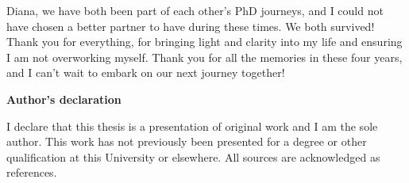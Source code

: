 Diana, we have both been part of each other's PhD journeys, and I could not have chosen a better partner to have during these times. We both survived! Thank you for everything, for bringing light and clarity into my life and ensuring I am not overworking myself. Thank you for all the memories in these four years, and I can't wait to embark on our next journey together!











\newpage 

\thispagestyle{plain}
\begin{center}
    \Large        
    \textbf{Author's declaration}
    \vspace{0.9cm}

\end{center}


I declare that this thesis is a presentation of original work and I am the sole author. This work has not previously been presented for a degree or other qualification at this University or elsewhere. All sources are acknowledged as references.

